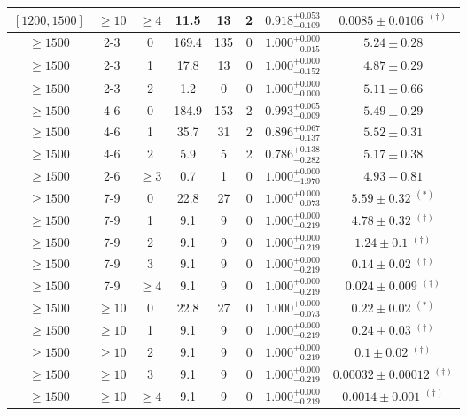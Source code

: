 \begin{table}[!htbp]
{\begin{tabular}{ccc|ccccc}
$[1200,1500]$ & $\geq10$ & $\geq4$ & 11.5 & 13 & 2 & $0.918^{+0.053}_{-0.109}$ & $0.0085 \pm 0.0106$ $^{(\dagger)}$ \\ 
\hline 
$\geq1500$ & 2-3 & 0 & 169.4 & 135 & 0 & $1.000^{+0.000}_{-0.015}$ & $5.24 \pm 0.28$ \\ 
$\geq1500$ & 2-3 & 1 & 17.8 & 13 & 0 & $1.000^{+0.000}_{-0.152}$ & $4.87 \pm 0.29$ \\ 
$\geq1500$ & 2-3 & 2 & 1.2 & 0 & 0 & $1.000^{+0.000}_{-0.000}$ & $5.11 \pm 0.66$ \\ 
$\geq1500$ & 4-6 & 0 & 184.9 & 153 & 2 & $0.993^{+0.005}_{-0.009}$ & $5.49 \pm 0.29$ \\ 
$\geq1500$ & 4-6 & 1 & 35.7 & 31 & 2 & $0.896^{+0.067}_{-0.137}$ & $5.52 \pm 0.31$ \\ 
$\geq1500$ & 4-6 & 2 & 5.9 & 5 & 2 & $0.786^{+0.138}_{-0.282}$ & $5.17 \pm 0.38$ \\ 
$\geq1500$ & 2-6 & $\geq3$ & 0.7 & 1 & 0 & $1.000^{+0.000}_{-1.970}$ & $4.93 \pm 0.81$ \\ 
$\geq1500$ & 7-9 & 0 & 22.8 & 27 & 0 & $1.000^{+0.000}_{-0.073}$ & $5.59 \pm 0.32$ $^{(*)}$ \\ 
$\geq1500$ & 7-9 & 1 & 9.1 & 9 & 0 & $1.000^{+0.000}_{-0.219}$ & $4.78 \pm 0.32$ $^{(\dagger)}$ \\ 
$\geq1500$ & 7-9 & 2 & 9.1 & 9 & 0 & $1.000^{+0.000}_{-0.219}$ & $1.24 \pm 0.1$ $^{(\dagger)}$ \\ 
$\geq1500$ & 7-9 & 3 & 9.1 & 9 & 0 & $1.000^{+0.000}_{-0.219}$ & $0.14 \pm 0.02$ $^{(\dagger)}$ \\ 
$\geq1500$ & 7-9 & $\geq4$ & 9.1 & 9 & 0 & $1.000^{+0.000}_{-0.219}$ & $0.024 \pm 0.009$ $^{(\dagger)}$ \\ 
$\geq1500$ & $\geq10$ & 0 & 22.8 & 27 & 0 & $1.000^{+0.000}_{-0.073}$ & $0.22 \pm 0.02$ $^{(*)}$ \\ 
$\geq1500$ & $\geq10$ & 1 & 9.1 & 9 & 0 & $1.000^{+0.000}_{-0.219}$ & $0.24 \pm 0.03$ $^{(\dagger)}$ \\ 
$\geq1500$ & $\geq10$ & 2 & 9.1 & 9 & 0 & $1.000^{+0.000}_{-0.219}$ & $0.1 \pm 0.02$ $^{(\dagger)}$ \\ 
$\geq1500$ & $\geq10$ & 3 & 9.1 & 9 & 0 & $1.000^{+0.000}_{-0.219}$ & $0.00032 \pm 0.00012$ $^{(\dagger)}$ \\ 
$\geq1500$ & $\geq10$ & $\geq4$ & 9.1 & 9 & 0 & $1.000^{+0.000}_{-0.219}$ & $0.0014 \pm 0.001$ $^{(\dagger)}$ \\ 
\hline
\end{tabular}
}
\end{table}
